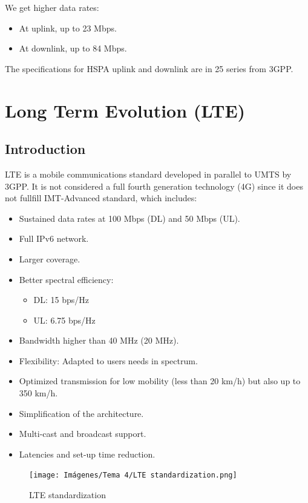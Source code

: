 \documentclass[
	12pt,
	twoside
]{book}
\begin{document}
We get higher data rates:
\begin{itemize}
	\item At uplink, up to 23 Mbps.
	\item At downlink, up to 84 Mbps.
\end{itemize}

The specifications for HSPA uplink and downlink are in 25 series from 3GPP.

\section{Long Term Evolution (LTE)}

\subsection{Introduction}

LTE is a mobile communications standard developed in parallel to UMTS by 3GPP. It is not considered a full fourth generation technology (4G) since it does not fullfill IMT-Advanced standard, which includes:
\begin{itemize}
	\item Sustained data rates at 100 Mbps (DL) and 50 Mbps (UL).
	\item Full IPv6 network.
	\item Larger coverage.
	\item {
		Better spectral efficiency:
		\begin{itemize}
			\item DL: 15 bps/Hz
			\item UL: 6.75 bps/Hz
		\end{itemize}
	}
	\item Bandwidth higher than 40 MHz (20 MHz).
	\item Flexibility: Adapted to users needs in spectrum.
	\item Optimized transmission for low mobility (less than 20 km/h) but also up to 350 km/h.
	\item Simplification of the architecture.
	\item Multi-cast and broadcast support.
	\item Latencies and set-up time reduction.
\end{itemize}

\begin{figure}[H]
	\centering
	\texttt{[image: Imágenes/Tema 4/LTE standardization.png]}
	\caption{
		\label{fig:unit4_LTE_stand}
		LTE standardization
	}
\end{figure}
\end{document}
